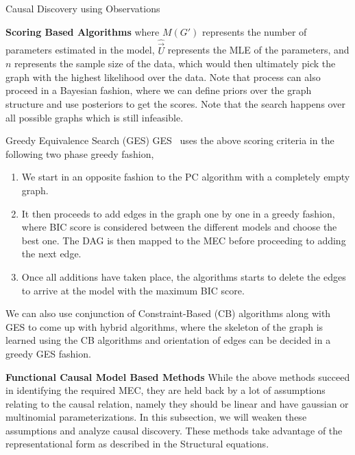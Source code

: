 \documentclass[10pt]{article}
\begin{document}
\begin{psection}[3]{Causal Discovery using Observations}
\begin{psubsection}{\textbf{Scoring Based Algorithms}}
        where $M(G')$ represents the number of parameters estimated in the model,
        $\hat{\vec{U}}$ represents the MLE of the parameters, and $n$ represents the
        sample size of the data, which would then ultimately pick the graph with the
        highest likelihood over the data. Note that process can also proceed in a
        Bayesian fashion, where we can define priors over the graph structure and use
        posteriors to get the scores. Note that the search happens over all possible
        graphs which is still infeasible. 
        \begin{pssubsection}{Greedy Equivalence Search (GES)}
        GES~\cite{chickering2002optimal} uses the above scoring criteria in the
        following two phase greedy fashion, 
        \begin{enumerate}
            \item We start in an opposite fashion to the PC algorithm with a completely
                empty graph. 
            \item It then proceeds to add edges in the graph one by one in a greedy
                fashion, where BIC score is considered between the different models and
                choose the best one. The DAG is then mapped to the MEC before proceeding
                to adding the next edge. 
            \item Once all additions have taken place, the algorithms starts to delete
                the edges to arrive at the model with the maximum BIC score. 
        \end{enumerate}
        \end{pssubsection}
        We can also use conjunction of Constraint-Based (CB) algorithms along with GES
        to come up with hybrid algorithms, where the skeleton of the graph is learned
        using the CB algorithms and orientation of edges can be decided in a greedy GES
        fashion.
    \end{psubsection}
    
    \begin{psubsection}{\textbf{Functional Causal Model Based Methods}}
        While the above methods succeed in identifying the required MEC, they are held
        back by a lot of assumptions relating to the causal relation, namely they should
        be linear and have gaussian or multinomial parameterizations. In this
        subsection, we will weaken these assumptions and analyze causal discovery. These
        methods take advantage of the representational form as described in the
        Structural equations.  
        

\end{psubsection}
\end{psection}
\end{document}
